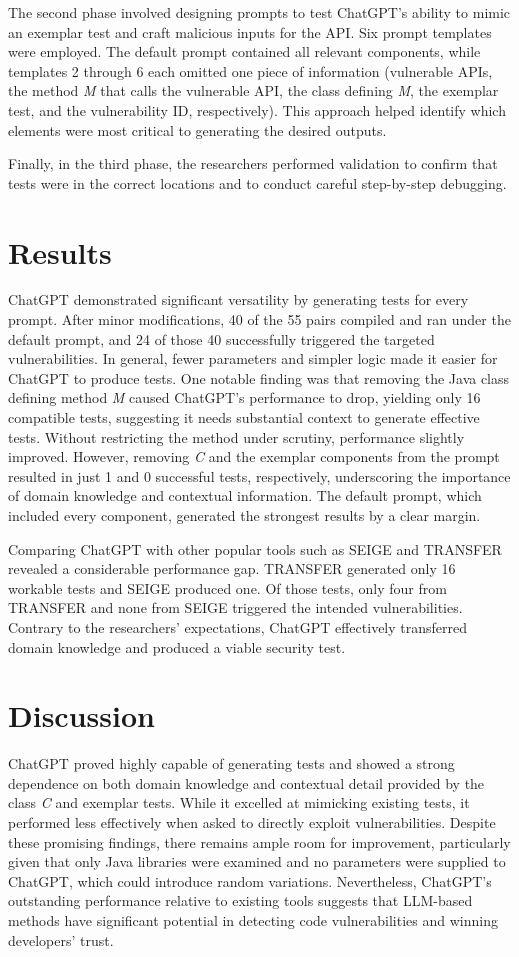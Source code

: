 \documentclass[12pt]{article}
\begin{document}
The second phase involved designing prompts to test ChatGPT’s ability to mimic an exemplar test and craft malicious inputs for the API. Six prompt templates were employed. The default prompt contained all relevant components, while templates 2 through 6 each omitted one piece of information (vulnerable APIs, the method \textit{M} that calls the vulnerable API, the class defining \textit{M}, the exemplar test, and the vulnerability ID, respectively). This approach helped identify which elements were most critical to generating the desired outputs.

Finally, in the third phase, the researchers performed validation to confirm that tests were in the correct locations and to conduct careful step-by-step debugging.

\section{Results}
ChatGPT demonstrated significant versatility by generating tests for every prompt. After minor modifications, 40 of the 55 pairs compiled and ran under the default prompt, and 24 of those 40 successfully triggered the targeted vulnerabilities. In general, fewer parameters and simpler logic made it easier for ChatGPT to produce tests. One notable finding was that removing the Java class defining method \textit{M} caused ChatGPT’s performance to drop, yielding only 16 compatible tests, suggesting it needs substantial context to generate effective tests. Without restricting the method under scrutiny, performance slightly improved. However, removing \textit{C} and the exemplar components from the prompt resulted in just 1 and 0 successful tests, respectively, underscoring the importance of domain knowledge and contextual information. The default prompt, which included every component, generated the strongest results by a clear margin.

Comparing ChatGPT with other popular tools such as SEIGE and TRANSFER revealed a considerable performance gap. TRANSFER generated only 16 workable tests and SEIGE produced one. Of those tests, only four from TRANSFER and none from SEIGE triggered the intended vulnerabilities. Contrary to the researchers’ expectations, ChatGPT effectively transferred domain knowledge and produced a viable security test.

\section{Discussion}
ChatGPT proved highly capable of generating tests and showed a strong dependence on both domain knowledge and contextual detail provided by the class \textit{C} and exemplar tests. While it excelled at mimicking existing tests, it performed less effectively when asked to directly exploit vulnerabilities. Despite these promising findings, there remains ample room for improvement, particularly given that only Java libraries were examined and no parameters were supplied to ChatGPT, which could introduce random variations. Nevertheless, ChatGPT’s outstanding performance relative to existing tools suggests that LLM-based methods have significant potential in detecting code vulnerabilities and winning developers’ trust.
\end{document}
